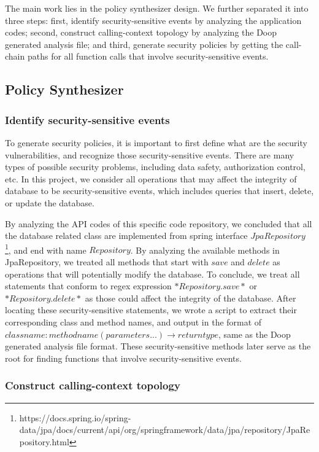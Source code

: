 The main work lies in the policy synthesizer design. We further separated it into three steps: first, identify security-sensitive events by analyzing the application codes; second, construct calling-context topology by analyzing the Doop generated analysis file; and third, generate security policies by getting the call-chain paths for all function calls that involve security-sensitive events.

\subsection{Policy Synthesizer}

\subsubsection{Identify security-sensitive events}
To generate security policies, it is important to first define what are the
security vulnerabilities, and recognize those security-sensitive events. There
are many types of possible security problems, including data safety,
authorization control, etc. In this project, we consider all operations that may
affect the integrity of database to be security-sensitive events, which includes
queries that insert, delete, or update the database.

By analyzing the API codes of this specific code repository, we concluded that
all the database related class are implemented from spring interface
$JpaRepository$
\footnote{https://docs.spring.io/spring-data/jpa/docs/current/api/org/springframework/data/jpa/repository/JpaRepository.html},
and end with name $Repository$. By analyzing the available methods in
JpaRepository, we treated all methods that start with $save$ and $delete$ as
operations that will potentially modify the database. To conclude, we treat all
statements that conform to regex expression $*Repository.save*$ or
$*Repository.delete*$ as those could affect the integrity of the database. After
locating these security-sensitive statements, we wrote a script to extract their
corresponding class and method names, and output in the format of
$classname:methodname(parameters...) \rightarrow return type$, same as the Doop
generated analysis file format. These security-sensitive methods later serve as
the root for finding functions that involve security-sensitive events.


\subsubsection{Construct calling-context topology}

